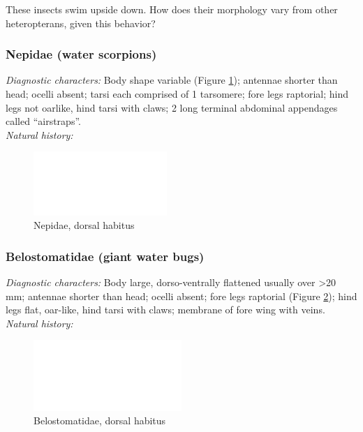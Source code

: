 \documentclass[letterpaper, 11pt]{article}
\begin{document}
\noindent{}These insects swim upside down. How does their morphology vary from other heteropterans, given this behavior?

\subsubsection{Nepidae (water scorpions)}
\noindent{}\textit{Diagnostic characters:} Body shape variable (Figure \ref{fig:nepid1}); antennae shorter than head; ocelli absent; tarsi each comprised of 1 tarsomere; fore legs raptorial; hind legs not oarlike, hind tarsi with claws; 2 long terminal abdominal appendages called ``airstraps''.\\

\noindent{}\textit{Natural history:} \\

\begin{figure}[ht!]
 \centering
 \includegraphics[width=0.45\textwidth]{image14}
 \caption{Nepidae, dorsal habitus}
 \label{fig:nepid1}
\end{figure}

\subsubsection{Belostomatidae (giant water bugs)}
\noindent{}\textit{Diagnostic characters:} Body large, dorso-ventrally flattened usually over \textgreater20 mm; antennae shorter than head; ocelli absent; fore legs raptorial (Figure \ref{fig:belostom1}); hind legs flat, oar-like, hind tarsi with claws; membrane of fore wing with veins.\\

\noindent{}\textit{Natural history:} \\

\begin{figure}[ht!]
 \centering
 \includegraphics[width=0.5\textwidth]{image14}
 \caption{Belostomatidae, dorsal habitus}
 \label{fig:belostom1}
\end{figure}
\end{document}

